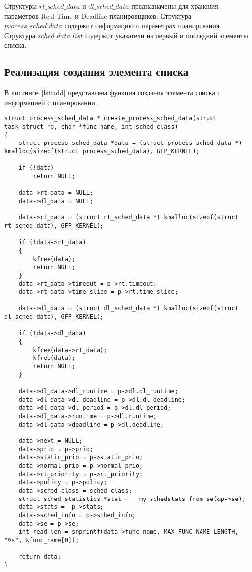 Структуры $rt\_sched\_data$ и $dl\_sched\_data$ предназначены для хранения параметров Real-Time и Deadline планировщиков.
Структура \\ $process\_sched\_data$ содержит информацию о параметрах планирования. \\
Структура $sched\_data\_list$ содержит указатели на первый и последний элементы списка.

\subsection{Реализация создания элемента списка}

В листинге~\ref{lst:add} представлена функция создания элемента списка с информацией о планировании.

\begin{lstlisting}[label=lst:add,caption=Функция создания элемента списка с информацией о планировании]
struct process_sched_data * create_process_sched_data(struct task_struct *p, char *func_name, int sched_class) 
{
	struct process_sched_data *data = (struct process_sched_data *) kmalloc(sizeof(struct process_sched_data), GFP_KERNEL);
	
	if (!data) 
		return NULL;
	
	data->rt_data = NULL;
	data->dl_data = NULL;
	
	data->rt_data = (struct rt_sched_data *) kmalloc(sizeof(struct rt_sched_data), GFP_KERNEL);
	
	if (!data->rt_data)
	{
		kfree(data);
		return NULL;
	}
	data->rt_data->timeout = p->rt.timeout;
	data->rt_data->time_slice = p->rt.time_slice;
	
	data->dl_data = (struct dl_sched_data *) kmalloc(sizeof(struct dl_sched_data), GFP_KERNEL);
	
	if (!data->dl_data)
	{
		kfree(data->rt_data);
		kfree(data);
		return NULL;
	}
	
	data->dl_data->dl_runtime = p->dl.dl_runtime;
	data->dl_data->dl_deadline = p->dl.dl_deadline;
	data->dl_data->dl_period = p->dl.dl_period;
	data->dl_data->runtime = p->dl.runtime;
	data->dl_data->deadline = p->dl.deadline;
	
	data->next = NULL;
	data->prio = p->prio;
	data->static_prio = p->static_prio;
	data->normal_prio = p->normal_prio;
	data->rt_priority = p->rt_priority;
	data->policy = p->policy;
	data->sched_class = sched_class;
	struct sched_statistics *stat = __my_schedstats_from_se(&p->se);
	data->stats =  p->stats;
	data->sched_info = p->sched_info;
	data->se = p->se;
	int read_len = snprintf(data->func_name, MAX_FUNC_NAME_LENGTH, "%s", &func_name[0]);
	
	return data;
}
\end{lstlisting}

